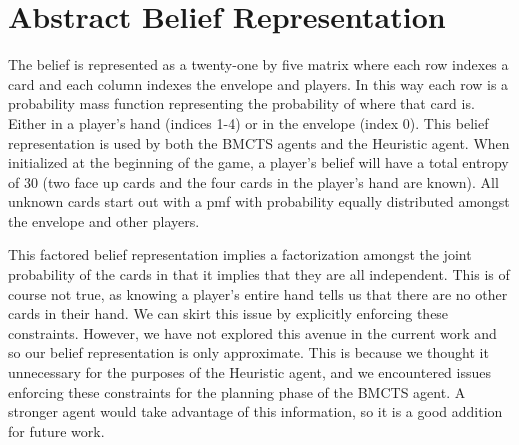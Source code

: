 \documentclass[msc, ai, logo, twoside, notimes, parskip, leftchapter, normalheadings]{infthesis}
\begin{document}
\chapter{Abstract Belief Representation}
The belief is represented as a twenty-one by five matrix where each row indexes a card and each column indexes the envelope and players. In this way each row is a probability mass function representing the probability of where that card is. Either in a player's hand (indices 1-4) or in the envelope (index 0). This belief representation is used by both the BMCTS agents and the Heuristic agent. When initialized at the beginning of the game, a player's belief will have a total entropy of 30 (two face up cards and the four cards in the player's hand are known). All unknown cards start out with a pmf with probability equally distributed amongst the envelope and other players. 

This factored belief representation implies a factorization amongst the joint probability of the cards in that it implies that they are all independent. This is of course not true, as knowing a player's entire hand tells us that there are no other cards in their hand. We can skirt this issue by explicitly enforcing these constraints. However, we have not explored this avenue in the current work and so our belief representation is only approximate. This is because we thought it unnecessary for the purposes of the Heuristic agent, and we encountered issues enforcing these constraints for the planning phase of the BMCTS agent. A stronger agent would take advantage of this information, so it is a good addition for future work.

\newpage
\nocite{*}
 

\end{document}
